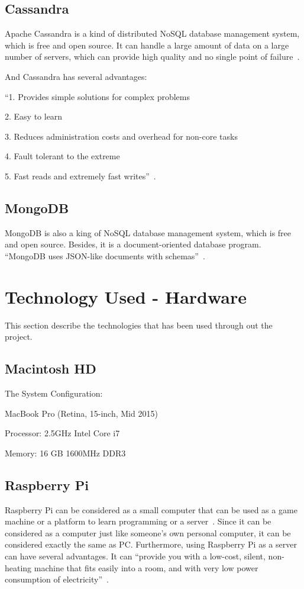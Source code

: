 \subsection{Cassandra}
Apache Cassandra is a kind of distributed NoSQL database management 
system, which is free and open source. It can handle a large amount of 
data on a large number of servers, which can provide high quality and no 
single point of failure~\cite{hid-sp18-508-cassandra}. 

And Cassandra has several advantages:

``1. Provides simple solutions for complex problems

2. Easy to learn

3. Reduces administration costs and overhead for non-core tasks

4. Fault tolerant to the extreme

5. Fast reads and extremely fast writes''~\cite{hid-sp18-508-cassandraAd}. 


\subsection{MongoDB}
MongoDB is also a king of NoSQL database management system, which 
is free and open source. Besides, it is a document-oriented database 
program. ``MongoDB uses JSON-like documents with 
schemas''~\cite{hid-sp18-508-mongodb}.

\section{Technology Used - Hardware}
This section describe the technologies that has been used through out 
the project.

\subsection{Macintosh HD}
The System Configuration:

MacBook Pro (Retina, 15-inch, Mid 2015)

Processor: 2.5GHz Intel Core i7

Memory: 16 GB 1600MHz DDR3


\subsection{Raspberry Pi}
Raspberry Pi can be considered as a small computer that can be used 
as a game machine or a platform to learn programming or a 
server~\cite{hid-sp18-508-raspberryPi}. Since it can be considered as a
computer just like someone's own personal computer, it can be considered 
exactly the same as PC. Furthermore, using Raspberry Pi as a server can
have  several advantages. It can ``provide you with a low-cost, silent, non-heating
 machine that fits easily into a room, and with very low power consumption of
 electricity''~\cite{hid-sp18-508-raspberryServer}.

